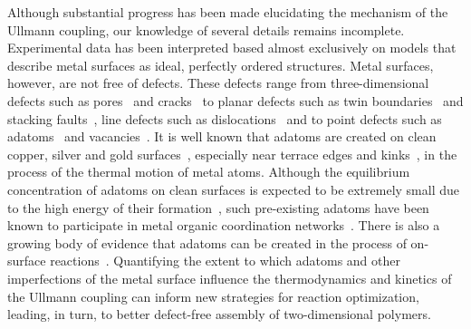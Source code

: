 \documentclass[aps,prb,amsmath,amssymb,11pt]{revtex4-1}
\begin{document}
Although substantial progress has been made elucidating the mechanism of the Ullmann coupling, our knowledge of several details remains incomplete. Experimental data has been interpreted based almost exclusively on models that describe metal surfaces as ideal, perfectly ordered structures. 
%
Metal surfaces, however, are not free of defects. These defects range from three-dimensional defects such as pores~\cite{ullmann_72} and cracks~\cite{ullmann_73} to planar defects such as twin boundaries~\cite{ullmann_74} and stacking faults~\cite{ullmann_75}, line defects such as dislocations~\cite{Ullmann_76} and to point defects such as adatoms~\cite{Ullmann_77} and vacancies~\cite{ullmann_78}.
%
It is well known that adatoms are created on clean copper, silver and gold surfaces~\cite{ullmann_79, ullmann_58}, especially near terrace edges and kinks~\cite{ullmann_84, ullmann_85}, in the process of the thermal motion of metal atoms. 
Although the equilibrium concentration of adatoms on clean surfaces is expected to be extremely small due to the high energy of their formation~\cite{chemeurope2017}, such pre-existing adatoms have been known to participate in metal organic coordination networks~\cite{ullmann_80, ullmann_81, ullmann_82, ullmann_83}.
There is also a growing body of evidence that adatoms can be created in the process of on-surface reactions~\cite{ullmann_146, ullmann_53, chematerial2019, ullmann_147, chemeurope2017, ullmann_98, ullmann_91}. %
Quantifying the extent to which adatoms and other imperfections of the metal surface influence the thermodynamics and kinetics of the Ullmann coupling can inform new strategies for reaction optimization, leading, in turn, to better defect-free assembly of two-dimensional polymers. 
\end{document}
